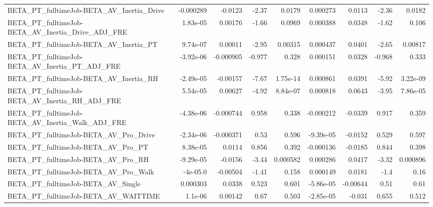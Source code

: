 \begin{tabular}{lrrrrrrrr}
BETA\_PT\_fulltimeJob-BETA\_AV\_Inertia\_Drive          &   -0.000289 &      -0.0123 &    -2.37 &   0.0179 &   0.000273 &      0.0113 &        -2.36 &        0.0182 \\
BETA\_PT\_fulltimeJob-BETA\_AV\_Inertia\_Drive\_ADJ\_FRE  &    1.83e-05 &      0.00176 &    -1.66 &   0.0969 &   0.000388 &      0.0348 &        -1.62 &         0.106 \\
BETA\_PT\_fulltimeJob-BETA\_AV\_Inertia\_PT             &    9.74e-07 &      0.00011 &    -2.95 &  0.00315 &   0.000437 &      0.0401 &        -2.65 &       0.00817 \\
BETA\_PT\_fulltimeJob-BETA\_AV\_Inertia\_PT\_ADJ\_FRE     &   -3.92e-06 &    -0.000905 &   -0.977 &    0.328 &   0.000151 &      0.0328 &       -0.968 &         0.333 \\
BETA\_PT\_fulltimeJob-BETA\_AV\_Inertia\_RH             &   -2.49e-05 &     -0.00157 &    -7.67 & 1.75e-14 &   0.000861 &      0.0391 &        -5.92 &      3.22e-09 \\
BETA\_PT\_fulltimeJob-BETA\_AV\_Inertia\_RH\_ADJ\_FRE     &    5.54e-05 &      0.00627 &    -4.92 & 8.84e-07 &   0.000818 &      0.0643 &        -3.95 &      7.86e-05 \\
BETA\_PT\_fulltimeJob-BETA\_AV\_Inertia\_Walk\_ADJ\_FRE   &   -4.38e-06 &    -0.000744 &    0.958 &    0.338 &  -0.000212 &     -0.0339 &        0.917 &         0.359 \\
BETA\_PT\_fulltimeJob-BETA\_AV\_Pro\_Drive              &   -2.34e-06 &    -0.000371 &     0.53 &    0.596 &  -9.39e-05 &     -0.0152 &        0.529 &         0.597 \\
BETA\_PT\_fulltimeJob-BETA\_AV\_Pro\_PT                 &    8.38e-05 &       0.0114 &    0.856 &    0.392 &  -0.000136 &     -0.0185 &        0.844 &         0.398 \\
BETA\_PT\_fulltimeJob-BETA\_AV\_Pro\_RH                 &   -9.29e-05 &      -0.0156 &    -3.44 & 0.000582 &   0.000286 &      0.0417 &        -3.32 &      0.000896 \\
BETA\_PT\_fulltimeJob-BETA\_AV\_Pro\_Walk               &    -4e-05.0 &     -0.00504 &    -1.41 &    0.158 &   0.000149 &      0.0181 &         -1.4 &          0.16 \\
BETA\_PT\_fulltimeJob-BETA\_AV\_Single                 &    0.000303 &       0.0338 &    0.523 &    0.601 &  -5.86e-05 &    -0.00644 &         0.51 &          0.61 \\
BETA\_PT\_fulltimeJob-BETA\_AV\_WAITTIME               &     1.1e-06 &      0.00142 &     0.67 &    0.503 &  -2.85e-05 &      -0.031 &        0.655 &         0.512 \\

\end{tabular}
